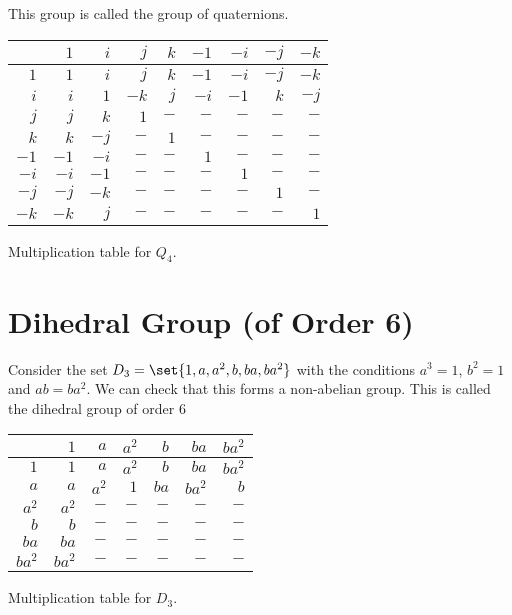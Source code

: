 \documentclass[11pt]{penrose}
\begin{document}
This group is called the group of quaternions.
\begin{center}
\begin{tabularx}{0.62\textwidth}{|R||R|R|R|R|R|R|R|R|}
    \hline
         & $ 1$ & $ i$ & $ j$ & $ k$ & $-1$ & $-i$ & $-j$ & $-k$ \\ \hline\hline
    $ 1$ & $ 1$ & $ i$ & $ j$ & $ k$ & $-1$ & $-i$ & $-j$ & $-k$ \\ \hline
    $ i$ & $ i$ & $ 1$ & $-k$ & $ j$ & $-i$ & $-1$ & $ k$ & $-j$ \\ \hline
    $ j$ & $ j$ & $ k$ & $ 1$ & $ -$ & $ -$ & $ -$ & $ -$ & $ -$ \\ \hline
    $ k$ & $ k$ & $-j$ & $ -$ & $ 1$ & $ -$ & $ -$ & $ -$ & $ -$ \\ \hline
    $-1$ & $-1$ & $-i$ & $ -$ & $ -$ & $ 1$ & $ -$ & $ -$ & $ -$ \\ \hline
    $-i$ & $-i$ & $-1$ & $ -$ & $ -$ & $ -$ & $ 1$ & $ -$ & $ -$ \\ \hline
    $-j$ & $-j$ & $-k$ & $ -$ & $ -$ & $ -$ & $ -$ & $ 1$ & $ -$ \\ \hline
    $-k$ & $-k$ & $ j$ & $ -$ & $ -$ & $ -$ & $ -$ & $ -$ & $ 1$ \\ \hline
\end{tabularx}

{Multiplication table for $Q_4$.}
\end{center}

\section{Dihedral Group (of Order 6)}
Consider the set $D_3  =\set{1, a, a^2, b, ba, ba^2}$ with the conditions $a^3 = 1$, $b^2 = 1$ and $ab = ba^2$. We can check that this forms a non-abelian group. This is called the dihedral group of order $6$

\begin{center}
\begin{tabularx}{0.62\textwidth}{|R||R|R|R|R|R|R|}
    \hline
           & $   1$ & $   a$ & $ a^2$ & $   b$ & $  ba$ & $ba^2$ \\ \hline\hline
    $   1$ & $   1$ & $   a$ & $ a^2$ & $   b$ & $  ba$ & $ba^2$ \\ \hline
    $   a$ & $   a$ & $ a^2$ & $   1$ & $  ba$ & $ba^2$ & $   b$ \\ \hline
    $ a^2$ & $ a^2$ & $   -$ & $   -$ & $   -$ & $   -$ & $   -$ \\ \hline
    $   b$ & $   b$ & $   -$ & $   -$ & $   -$ & $   -$ & $   -$ \\ \hline
    $  ba$ & $  ba$ & $   -$ & $   -$ & $   -$ & $   -$ & $   -$ \\ \hline
    $ba^2$ & $ba^2$ & $   -$ & $   -$ & $   -$ & $   -$ & $   -$ \\ \hline
\end{tabularx}

{Multiplication table for $D_3$.}
\end{center}
\end{document}
